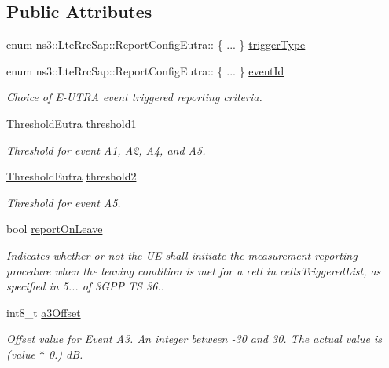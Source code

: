 \subsection*{Public Attributes}
\begin{DoxyCompactItemize}
\item 
enum ns3\+::\+Lte\+Rrc\+Sap\+::\+Report\+Config\+Eutra\+:: \{ ... \}  \hyperlink{structns3_1_1LteRrcSap_1_1ReportConfigEutra_a502800e0549f5ed2fe9f0cd7b8ee3415}{trigger\+Type}
\item 
enum ns3\+::\+Lte\+Rrc\+Sap\+::\+Report\+Config\+Eutra\+:: \{ ... \}  \hyperlink{structns3_1_1LteRrcSap_1_1ReportConfigEutra_a1fbe931cc9584614d20f4affbce70d8a}{event\+Id}
\begin{DoxyCompactList}\small\item\em Choice of E-\/\+U\+T\+RA event triggered reporting criteria. \end{DoxyCompactList}\item 
\hyperlink{structns3_1_1LteRrcSap_1_1ThresholdEutra}{Threshold\+Eutra} \hyperlink{structns3_1_1LteRrcSap_1_1ReportConfigEutra_a8f36bc45a61054920e490be8bf33b4ca}{threshold1}
\begin{DoxyCompactList}\small\item\em Threshold for event A1, A2, A4, and A5. \end{DoxyCompactList}\item 
\hyperlink{structns3_1_1LteRrcSap_1_1ThresholdEutra}{Threshold\+Eutra} \hyperlink{structns3_1_1LteRrcSap_1_1ReportConfigEutra_a4c76552279ea09626d15b48b341bfbd1}{threshold2}
\begin{DoxyCompactList}\small\item\em Threshold for event A5. \end{DoxyCompactList}\item 
bool \hyperlink{structns3_1_1LteRrcSap_1_1ReportConfigEutra_a1463979cc3e1e6165cfd1ed8d5bc8547}{report\+On\+Leave}
\begin{DoxyCompactList}\small\item\em Indicates whether or not the UE shall initiate the measurement reporting procedure when the leaving condition is met for a cell in {\ttfamily cells\+Triggered\+List}, as specified in 5... of 3\+G\+PP TS 36.. \end{DoxyCompactList}\item 
int8\+\_\+t \hyperlink{structns3_1_1LteRrcSap_1_1ReportConfigEutra_ae3226d3c9ec9988fefee04790ac6c9f6}{a3\+Offset}
\begin{DoxyCompactList}\small\item\em Offset value for Event A3. An integer between -\/30 and 30. The actual value is (value $\ast$ 0.) dB. \end{DoxyCompactList}\item 

\end{DoxyCompactItemize}
